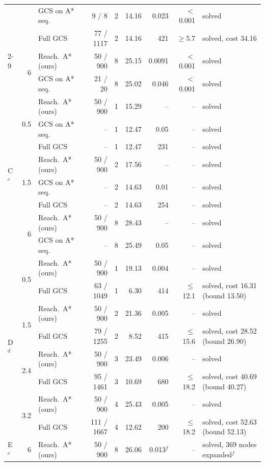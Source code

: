 \begin{table}[t]
\begin{tabular}{@{}l r l r r r r r l@{}}
 & & GCS on A* seq. & 9 / 8 & 2 & 14.16 & 0.023 & $<$0.001 & solved\\
 & & Full GCS & 77 / 1117 & 2 & 14.16 & 421 & $\ge$5.7 & solved, cost 34.16\\
\cmidrule(l){2-9}
 & \multirow{2}{*}{6} & Reach.\ A* (ours) & 50 / 900 & 8 & 25.15 & 0.0091 & $<$0.001 & solved\\
 & & GCS on A* seq. & 21 / 20 & 8 & 25.02 & 0.046 & $<$0.001 & solved\\
\midrule
\multirow{8}{*}{C$^{c}$} & \multirow{3}{*}{0.5} & Reach.\ A* (ours) & 50 / 900 & 1 & 15.29 & -- & -- & solved\\
 & & GCS on A* seq. & -- & 1 & 12.47 & 0.05 & -- & solved\\
 & & Full GCS & -- & 1 & 12.47 & 231 & -- & solved\\
\cmidrule(l){2-9}
 & \multirow{3}{*}{1.5} & Reach.\ A* (ours) & 50 / 900 & 2 & 17.56 & -- & -- & solved\\
 & & GCS on A* seq. & -- & 2 & 14.63 & 0.01 & -- & solved\\
 & & Full GCS & -- & 2 & 14.63 & 254 & -- & solved\\
\cmidrule(l){2-9}
 & \multirow{2}{*}{6} & Reach.\ A* (ours) & 50 / 900 & 8 & 28.43 & -- & -- & solved\\
 & & GCS on A* seq. & -- & 8 & 25.49 & 0.05 & -- & solved\\
\midrule
\multirow{8}{*}{D$^{d}$} & \multirow{2}{*}{0.5} & Reach.\ A* (ours) & 50 / 900 & 1 & 19.13 & 0.004 & -- & solved\\
 & & Full GCS & 63 / 1049 & 1 & 6.30 & 414 & $\le$12.1 & solved, cost 16.31 (bound 13.50)\\
\cmidrule(l){2-9}
 & \multirow{2}{*}{1.5} & Reach.\ A* (ours) & 50 / 900 & 2 & 21.36 & 0.005 & -- & solved\\
 & & Full GCS & 79 / 1255 & 2 & 8.52 & 415 & $\le$15.6 & solved, cost 28.52 (bound 26.90)\\
\cmidrule(l){2-9}
 & \multirow{2}{*}{2.4} & Reach.\ A* (ours) & 50 / 900 & 3 & 23.49 & 0.006 & -- & solved\\
 & & Full GCS & 95 / 1461 & 3 & 10.69 & 680 & $\le$18.2 & solved, cost 40.69 (bound 40.27)\\
\cmidrule(l){2-9}
 & \multirow{2}{*}{3.2} & Reach.\ A* (ours) & 50 / 900 & 4 & 25.43 & 0.005 & -- & solved\\
 & & Full GCS & 111 / 1667 & 4 & 12.62 & 200 & $\le$18.2 & solved, cost 52.63 (bound 52.13)\\
\midrule
\multirow{8}{*}{E$^{e}$} & \multirow{8}{*}{6} & Reach.\ A* (ours) & 50 / 900 & 8 & 26.06 & 0.013$^{f}$ & -- & solved, 369 nodes expanded$^{f}$\\

\end{tabular}
\end{table}
